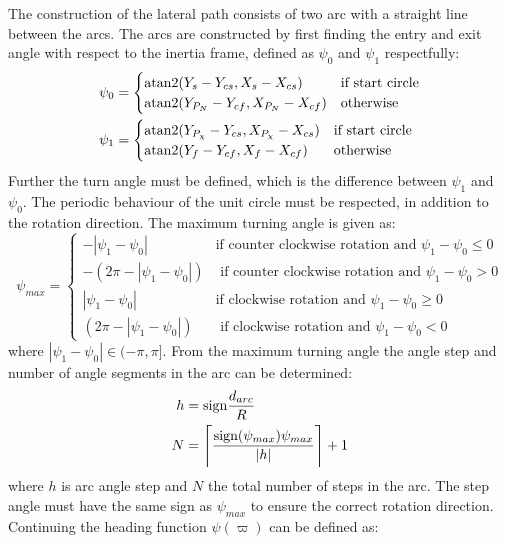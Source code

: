 The construction of the lateral path consists of two arc with a straight line between the arcs. The arcs are constructed by first finding the entry and exit angle with respect to the inertia frame, defined as $\psi_0$ and $\psi_1$ respectfully:
\begin{subequations}
\begin{align}
\psi_0 &= \begin{cases}
\atan2(Y_s-Y_{cs},X_s-X_{cs}) & \text{if start circle} \\
\atan2(Y_{P_N}-Y_{cf},X_{P_N}-X_{cf}) & \text{otherwise}
\end{cases}\\
\psi_1 &= \begin{cases}
\atan2(Y_{P_\chi}-Y_{cs},X_{P_{\chi}}-X_{cs}) & \text{if start circle} \\
\atan2(Y_{f}-Y_{cf},X_{f}-X_{cf}) & \text{otherwise}
\end{cases}
\end{align}
\end{subequations}
Further the turn angle must be defined, which is the difference between $\psi_1$ and $\psi_0$. The periodic behaviour of the unit circle must be respected, in addition to the rotation direction. The maximum turning angle is given as:
\begin{equation}
\psi_{max} = \begin{cases}
-|\psi_1 - \psi_0| & \text{if counter clockwise rotation and } \psi_1 - \psi_0 \leq 0 \\
-(2\pi - |\psi_1-\psi_0|) & \text{ if counter clockwise rotation and } \psi_1 - \psi_0 > 0 \\
|\psi_1 - \psi_0| & \text{if clockwise rotation and } \psi_1 - \psi_0 \geq 0 \\
(2\pi - |\psi_1-\psi_0|) & \text{ if clockwise rotation and } \psi_1 - \psi_0 < 0
\end{cases}
\end{equation}
where $|\psi_1-\psi_0| \in(-\pi,\pi]$. From the maximum turning angle the angle step and number of angle segments in the arc can be determined:
\begin{subequations}
\begin{align}
h &= \text{sign}\frac{d_{arc}}{R} \\
N &= \ceil[\Bigg]{\frac{\text{sign}(\psi_{max})\psi_{max}}{|h|}} + 1
\end{align}
\end{subequations}
where $h$ is arc angle step and $N$ the total number of steps in the arc. The step angle must have the same sign as $\psi_{max}$ to ensure the correct rotation direction. Continuing the heading function $\psi(\varpi)$ can be defined as:
